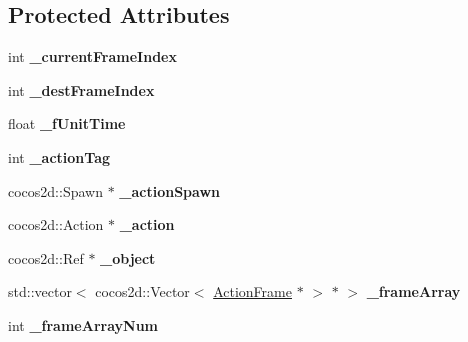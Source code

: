 \subsection*{Protected Attributes}
\begin{DoxyCompactItemize}
\item 
\mbox{\label{classcocostudio_1_1ActionNode_a02c2e32cccf3299523baf9fb12fee034}} 
int {\bfseries \+\_\+current\+Frame\+Index}
\item 
\mbox{\label{classcocostudio_1_1ActionNode_a0b431d9b786bb0671036ce7d9483809a}} 
int {\bfseries \+\_\+dest\+Frame\+Index}
\item 
\mbox{\label{classcocostudio_1_1ActionNode_a69542899de80d59e23463714a3242c5b}} 
float {\bfseries \+\_\+f\+Unit\+Time}
\item 
\mbox{\label{classcocostudio_1_1ActionNode_ac30ff54c9b2190fc8c3e8304620bc10a}} 
int {\bfseries \+\_\+action\+Tag}
\item 
\mbox{\label{classcocostudio_1_1ActionNode_af522f07b51e5a863d370fbe468a79e28}} 
cocos2d\+::\+Spawn $\ast$ {\bfseries \+\_\+action\+Spawn}
\item 
\mbox{\label{classcocostudio_1_1ActionNode_a5fa2ede169682dc414c0962e6641e8a5}} 
cocos2d\+::\+Action $\ast$ {\bfseries \+\_\+action}
\item 
\mbox{\label{classcocostudio_1_1ActionNode_a5916f9b70f84882e02ba731f3d8c3310}} 
cocos2d\+::\+Ref $\ast$ {\bfseries \+\_\+object}
\item 
\mbox{\label{classcocostudio_1_1ActionNode_a02ef43e8a0b3bdd3ce240e8195e2d5f2}} 
std\+::vector$<$ cocos2d\+::\+Vector$<$ \hyperlink{classcocostudio_1_1ActionFrame}{Action\+Frame} $\ast$ $>$ $\ast$ $>$ {\bfseries \+\_\+frame\+Array}
\item 
\mbox{\label{classcocostudio_1_1ActionNode_a78cd5985bc056dba6a5e1135b216b5f1}} 
int {\bfseries \+\_\+frame\+Array\+Num}
\end{DoxyCompactItemize}


